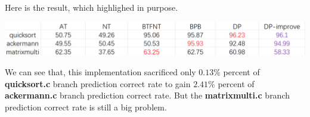 \documentclass{article}
\begin{document}
Here is the result, which highlighed in purpose.
\begin{center}
  \includegraphics[scale = 0.25]{prove result.png}\\
\end{center}
We can see that, this implementation sacrificed only $0.13\%$ percent of \textbf{quicksort.c} branch prediction correct rate to gain $2.41\%$ percent of \textbf{ackermann.c} branch prediction correct rate. But the \textbf{matrixmulti.c} branch prediction correct rate is still a big problem.
\end{document}
